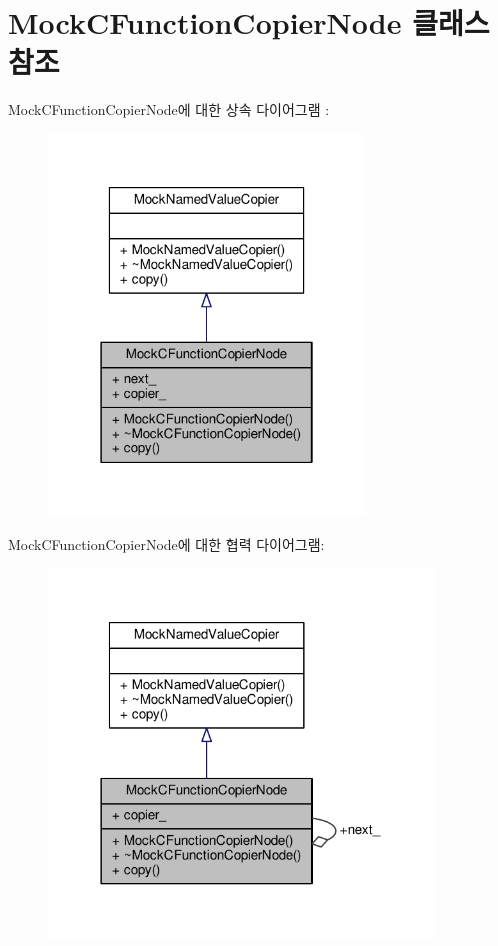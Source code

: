 \hypertarget{class_mock_c_function_copier_node}{}\section{Mock\+C\+Function\+Copier\+Node 클래스 참조}
\label{class_mock_c_function_copier_node}


Mock\+C\+Function\+Copier\+Node에 대한 상속 다이어그램 \+: 
\nopagebreak
\begin{figure}[H]
\begin{center}
\leavevmode
\includegraphics[width=238pt]{class_mock_c_function_copier_node__inherit__graph}
\end{center}
\end{figure}


Mock\+C\+Function\+Copier\+Node에 대한 협력 다이어그램\+:
\nopagebreak
\begin{figure}[H]
\begin{center}
\leavevmode
\includegraphics[width=290pt]{class_mock_c_function_copier_node__coll__graph}
\end{center}
\end{figure}
